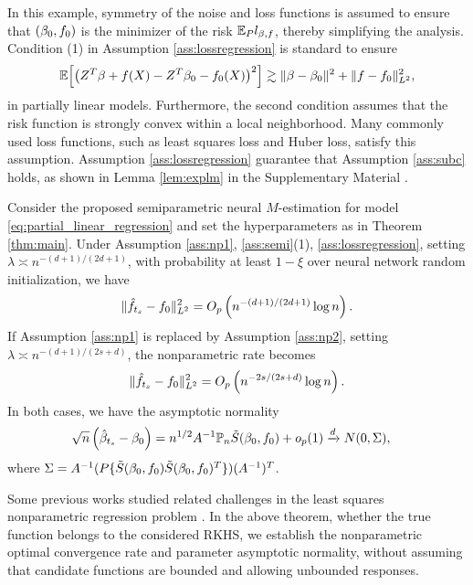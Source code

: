 In this example, symmetry of the noise and loss functions is assumed to ensure that \( (\beta_{0}, f_{0}) \) is the minimizer of the risk \( \mathbb{E}_P l_{\beta, f} \), thereby simplifying the analysis. 
Condition (1) in Assumption \ref{ass:lossregression} is standard \citep{kosorok2008introduction} to ensure
$$\mathbb{E}\Big[ \big( Z^{T}\beta + f(X) - Z^{T}\beta_{0} - f_{0}(X)  \big)^2 \Big] \gtrsim \|\beta - \beta_{0}\|^2 + \| f - f_{0} \|_{L^2}^2, $$ 
in partially linear models. 
Furthermore, the second condition assumes that the risk function is strongly convex within a local neighborhood. Many commonly used loss functions, such as least squares loss and Huber loss, satisfy this assumption. Assumption \ref{ass:lossregression} guarantee that Assumption \ref{ass:subc} holds, as shown in Lemma \ref{lem:explm} in the Supplementary Material \citep{supplyment}.



\begin{theorem}\label{cor:reg}
Consider the proposed semiparametric neural $M$-estimation for model \eqref{eq:partial_linear_regression} and set the hyperparameters as in Theorem \ref{thm:main}. Under Assumption \ref{ass:np1}, \ref{ass:semi}(1), \ref{ass:lossregression}, %
setting $\lambda \asymp n^{-(d+1)/(2d+1)}$, with probability at least $1-\xi$ over neural network random initialization, 
we have 
$$
\| \hat{f}_{t_{s}} - f_{0} \|_{L^2}^2 = O_p\left( n^{-(d+1)/(2d+1)} \log n \right). 
$$
If Assumption \ref{ass:np1} is replaced by Assumption \ref{ass:np2}, setting $\lambda \asymp n^{-(d+1)/(2s+d)}$, the nonparametric rate becomes 
$$
    \| \hat{f}_{t_{s}} - f_{0} \|_{L^2}^2 = O_p\left( n^{-2s/(2s+d)} \log n \right).
$$ 
In both cases, we have the asymptotic normality
\begin{equation}\label{equ:normal3}
\begin{aligned}
&\sqrt{n}\left(\hat{\beta}_{t_{s}}-\beta_{0}\right)=
n^{1/2}  A^{-1}  \mathbb{P}_{n} \tilde{S}(\beta_{0}, f_{0}) +o_p(1) 
\xrightarrow{d} N(0, \Sigma), 
\end{aligned}
\end{equation}
where $\Sigma=A^{-1} (P \{ \tilde{S}(\beta_{0}, f_{0})\tilde{S}(\beta_{0}, f_{0})^{T} \}) (A^{-1})^T $. 
\end{theorem}

Some previous works studied related challenges in the least squares nonparametric regression problem \citep{mendelson2010regularization, steinwart2009optimal}. 
In the above theorem, whether the true function belongs to the considered RKHS, we establish the nonparametric optimal convergence rate and parameter asymptotic normality, without assuming that candidate functions are bounded and allowing unbounded responses. 

